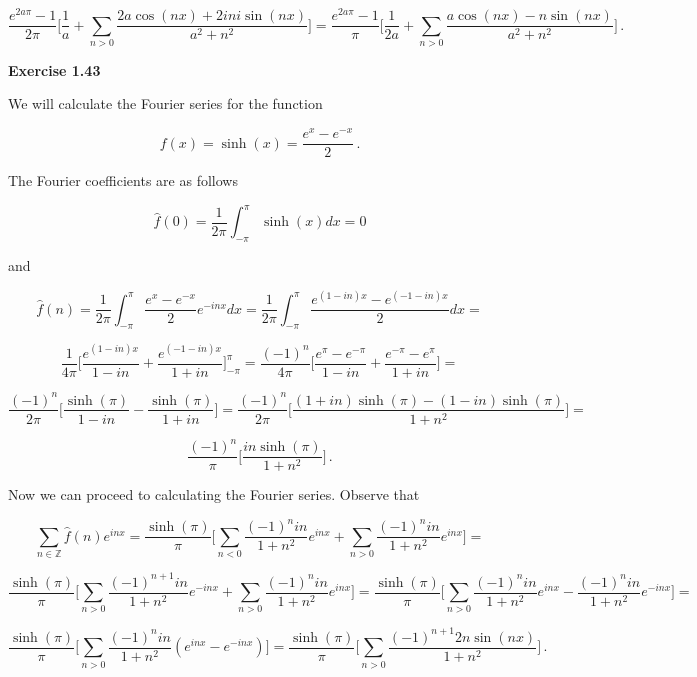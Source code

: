 \documentclass[a4paper]{article}
\newcommand {\intg} [4] {\int_{#1}^{#2} #3 d#4}
\numberwithin{equation}{section}
\begin{document}
\begin{description}
$$\frac{e^{2a\pi}-1}{2\pi}\Bigg[\frac{1}{a} + \sum_{n>0}\frac{2a\cos(nx)+2ini\sin(nx)}{a^2+n^2}\Bigg] = \frac{e^{2a\pi}-1}{\pi}\Bigg[\frac{1}{2a} + \sum_{n>0}\frac{a\cos(nx)-n\sin(nx)}{a^2+n^2}\Bigg]\,.$$

\item{\bf{Exercise 1.43}}\\

\item We will calculate the Fourier series for the function 

$$f(x) = \sinh(x) = \frac{e^x-e^{-x}}{2}\,.$$

The Fourier coefficients are as follows 

$$\hat{f}(0) = \frac{1}{2\pi}\intg{-\pi}{\pi}{\sinh(x)}{x} = 0$$

and

$$\hat{f}(n) = \frac{1}{2\pi}\intg{-\pi}{\pi}{\frac{e^x-e^{-x}}{2}e^{-inx}}{x} = \frac{1}{2\pi}\intg{-\pi}{\pi}{\frac{e^{(1-in)x}-e^{(-1-in)x}}{2}}{x} = $$

$$\frac{1}{4\pi}\Big[\frac{e^{(1-in)x}}{1-in} + \frac{e^{(-1-in)x}}{1+in}\Big]_{-\pi}^{\pi} = \frac{(-1)^n}{4\pi}\Big[\frac{e^{\pi} - e^{-\pi}}{1-in} + \frac{e^{-\pi}-e^{\pi}}{1+in}\Big] = $$

$$\frac{(-1)^n}{2\pi}\Big[\frac{\sinh(\pi)}{1-in} - \frac{\sinh(\pi)}{1+in}\Big] = \frac{(-1)^n}{2\pi}\Big[\frac{(1+in)\sinh(\pi) - (1-in)\sinh(\pi)}{1+n^2}\Big] = $$

$$\frac{(-1)^n}{\pi}\Big[\frac{in\sinh(\pi)}{1+n^2}\Big]\,.$$

Now we can proceed to calculating the Fourier series. Observe that

$$\sum_{n \in \mathbb{Z}}\hat{f}(n)e^{inx} = \frac{\sinh(\pi)}{\pi}\Big[\sum_{n<0}\frac{(-1)^nin}{1+n^2}e^{inx} + \sum_{n>0}\frac{(-1)^nin}{1+n^2}e^{inx}\Big] = $$

$$\frac{\sinh(\pi)}{\pi}\Big[\sum_{n>0}\frac{(-1)^{n+1}in}{1+n^2}e^{-inx} + \sum_{n>0}\frac{(-1)^nin}{1+n^2}e^{inx}\Big] = \frac{\sinh(\pi)}{\pi}\Big[\sum_{n>0}\frac{(-1)^nin}{1+n^2}e^{inx} - \frac{(-1)^{n}in}{1+n^2}e^{-inx}\Big] = $$

$$\frac{\sinh(\pi)}{\pi}\Big[\sum_{n>0}\frac{(-1)^nin}{1+n^2}(e^{inx} - e^{-inx})\Big] = \frac{\sinh(\pi)}{\pi}\Big[\sum_{n>0}\frac{(-1)^{n+1}2n\sin(nx)}{1+n^2}\Big]\,.$$



\end{description}
\end{document}
